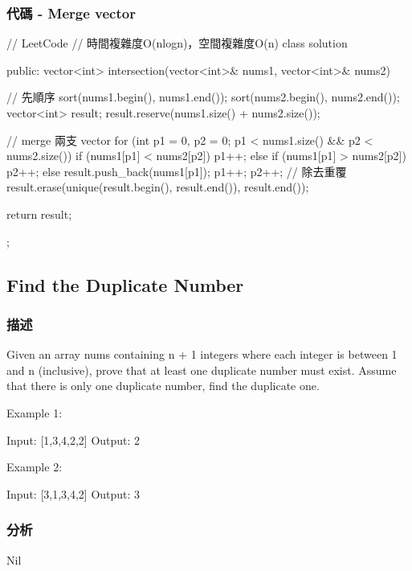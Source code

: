 \subsubsection{代碼 - Merge vector}
\begin{Code}
// LeetCode
// 時間複雜度O(nlogn)，空間複雜度O(n)
class solution{
public:
    vector<int> intersection(vector<int>& nums1, vector<int>& nums2) {
        // 先順序
        sort(nums1.begin(), nums1.end());
        sort(nums2.begin(), nums2.end());
        vector<int> result; result.reserve(nums1.size() + nums2.size());

        // merge 兩支 vector
        for (int p1 = 0, p2 = 0; p1 < nums1.size() && p2 < nums2.size()) {
            if (nums1[p1] < nums2[p2])
                p1++;
            else if (nums1[p1] > nums2[p2])
                p2++;
            else {
                result.push_back(nums1[p1]);
                p1++;
                p2++;
            }
        }
        // 除去重覆
        result.erase(unique(result.begin(), result.end()), result.end());

        return result;
    }
};
\end{Code}


\subsection{Find the Duplicate Number}
\label{sec:find-the-duplicate-number}


\subsubsection{描述}
Given an array nums containing n + 1 integers where each integer is between 1 and n (inclusive), prove that at least one duplicate number must exist. Assume that there is only one duplicate number, find the duplicate one.


Example 1:
\begin{Code}
Input: [1,3,4,2,2]
Output: 2
\end{Code}

Example 2:
\begin{Code}
Input: [3,1,3,4,2]
Output: 3
\end{Code}


\subsubsection{分析}
Nil

